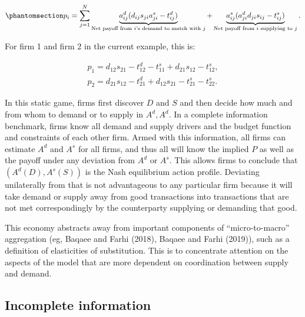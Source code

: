 \documentclass[
]{article}
\theoremstyle{definition}
\theoremstyle{plain}
\theoremstyle{remark}
\begin{document}
\begin{equation}\phantomsection\label{eq-firmlevelpayoff}{
p_i = \sum_{j=1}^N \underbrace{a_{ij}^d (d_{ij} s_{ji} a_{ji}^s - t_{ij}^d)}_{\text{Net payoff from $i$'s demand to match with $j$}} + \underbrace{a_{ij}^s (a_{ji}^d d_{ji} s_{ij} - t_{ij}^s)}_{\text{Net payoff from $i$ supplying to $j$}}.
}\end{equation}

For firm 1 and firm 2 in the current example, this is:

\[
\begin{split}
p_1 = d_{12} s_{21} - t_{12}^d - t_{11}^s + d_{21} s_{12} - t_{12}^s, \\
p_2 = d_{21} s_{12} -t_{21}^d + d_{12} s_{21} - t_{21}^s - t_{22}^s.
\end{split}
\]

In this static game, firms first discover \(D\) and \(S\) and then
decide how much and from whom to demand or to supply in \(A^d, A^d\). In
a complete information benchmark, firms know all demand and supply
drivers and the budget function and constraints of each other firm.
Armed with this information, all firms can estimate \(A^d\) and \(A^s\)
for all firms, and thus all will know the implied \(P\) as well as the
payoff under any deviation from \(A^d\) or \(A^s\). This allows firms to
conclude that \((A^d(D), A^s(S))\) is the Nash equilibrium action
profile. Deviating unilaterally from that is not advantageous to any
particular firm because it will take demand or supply away from good
transactions into transactions that are not met correspondingly by the
counterparty supplying or demanding that good.

This economy abstracts away from important components of
``micro-to-macro'' aggregation (eg, Baqaee and Farhi (2018), Baqaee and
Farhi (2019)), such as a definition of elasticities of substitution.
This is to concentrate attention on the aspects of the model that are
more dependent on coordination between supply and demand.

\subsection{Incomplete information}\label{incomplete-information}
\end{document}
